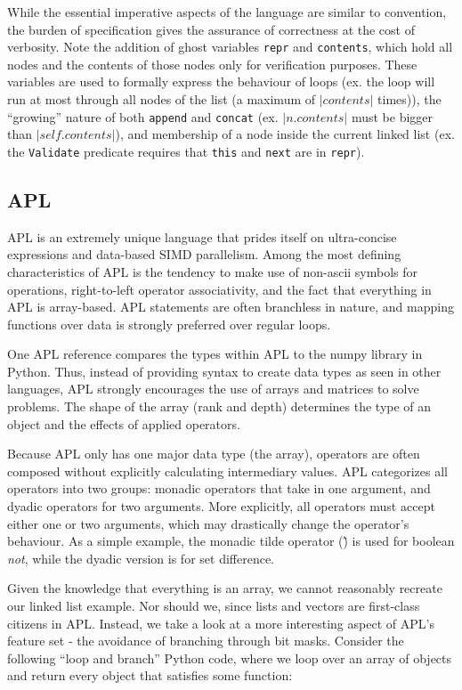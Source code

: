 \documentclass{article}
\begin{document}
While the essential imperative aspects of the language are similar to convention, the burden of specification
gives the assurance of correctness at the cost of verbosity.
Note the addition of ghost variables \texttt{repr} and \texttt{contents}, which hold all nodes and the contents of those
nodes only for verification purposes. These variables are used to formally express the behaviour of
loops (ex. the loop will run at most through all nodes of the list (a maximum of $|contents|$ times)),
the ``growing'' nature of both \texttt{append} and \texttt{concat} (ex. $|n.contents|$ must be bigger than $|self.contents|$),
and membership of a node inside the current linked list
(ex. the \texttt{Validate} predicate requires that \texttt{this} and \texttt{next} are in \texttt{repr}).


\subsection{APL}

APL is an extremely unique language that prides itself on ultra-concise expressions and data-based SIMD parallelism.
Among the most defining characteristics of APL is the tendency to make use of non-ascii symbols for operations,
right-to-left operator associativity, and the fact that everything in APL is array-based. APL statements are often
branchless in nature, and mapping functions over data is strongly preferred over regular loops.

One APL reference \cite{apl} compares the types within APL to the numpy library in Python.
Thus, instead of providing syntax to create data types as seen in other languages,
APL strongly encourages the use of arrays and matrices to solve problems.
The shape of the array (rank and depth) determines the type of an object and the effects of applied operators.

Because APL only has one major data type (the array), operators are often composed without explicitly
calculating intermediary values. APL categorizes all operators into two groups: monadic operators that take
in one argument, and dyadic operators for two arguments. More explicitly, all operators must accept
either one or two arguments, which may drastically change the operator's behaviour.
As a simple example, the monadic tilde operator (\~) is used for boolean \textit{not}, while the dyadic version
is for set difference.

Given the knowledge that everything is an array, we cannot reasonably recreate our linked list example. Nor should we,
since lists and vectors are first-class citizens in APL. Instead, we take a look at a more interesting aspect of APL's
feature set - the avoidance of branching through bit masks. Consider the following ``loop and branch'' Python code,
where we loop over an array of objects and return every object that satisfies some function:
\inputminted{python}{linked_list/apl_example.py}
\end{document}
